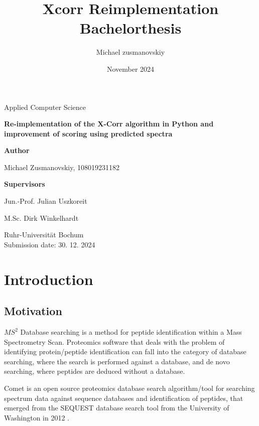 \documentclass{article}
\title{Xcorr Reimplementation Bachelorthesis}
\author{Michael zusmanovskiy}
\date{November 2024}
\begin{document}
\begin{titlepage}
    \begin{center}
        \LARGE
        Applied Computer Science

        \vspace{1.5cm}
            
        \LARGE
        \textbf{Re-implementation of the X-Corr algorithm in Python and improvement of scoring using predicted spectra}
            
        \vspace{1.5cm}

        \LARGE
        \textbf{Author}
        
        Michael Zusmanovskiy, 108019231182
        
        \vspace{1.5cm}
        
        \LARGE
        \textbf{Supervisors}
        
        Jun.-Prof. Julian Uszkoreit
        
        M.Sc. Dirk Winkelhardt
            
        \vfill
            

        \vspace{0.8cm}

        \Large
        Ruhr-Universität Bochum\\
        
        Submission date: 30. 12. 2024
            
    \end{center}
\end{titlepage}


\section{Introduction}
\subsection{Motivation}
\(MS^2\) Database searching is a method for peptide identification within a Mass Spectrometry Scan. Proteomics software
that deals with the problem of identifying protein/peptide identification can fall into the category of database searching,
where the search is performed against a database, and de novo searching, where peptides are deduced without a database.

Comet is an open source proteomics database search algorithm/tool for searching spectrum data against sequence databases and identification of peptides, that emerged from the SEQUEST database search tool from the University of Washington in 2012 \cite{comet-search-tool}.
\end{document}
